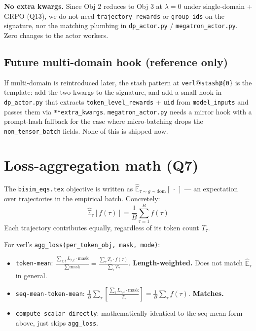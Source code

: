 \documentclass{article}
\begin{document}
\textbf{No extra kwargs.} Since Obj 2 reduces to Obj 3 at $\lambda=0$ under
single-domain + GRPO (Q13), we do not need \texttt{trajectory\_rewards}
or \texttt{group\_ids} on the signature, nor the matching plumbing in
\texttt{dp\_actor.py} / \texttt{megatron\_actor.py}. Zero changes to the
actor workers.

\subsection{Future multi-domain hook (reference only)}

If multi-domain is reintroduced later, the stash pattern at
\texttt{verl}@\texttt{stash@\{0\}} is the template: add the two kwargs to
the signature, and add a small hook in \texttt{dp\_actor.py} that extracts
\texttt{token\_level\_rewards} + \texttt{uid} from \texttt{model\_inputs}
and passes them via \texttt{**extra\_kwargs}. \texttt{megatron\_actor.py}
needs a mirror hook with a prompt-hash fallback for the case where
micro-batching drops the \texttt{non\_tensor\_batch} fields. None of this
is shipped now.

\section{Loss-aggregation math (Q7)}

The \texttt{bisim\_eqs.tex} objective is written as
$\widehat{\mathbb{E}}_{\tau \sim g \sim \text{dom}}[\,\cdot\,]$ --- an
expectation over trajectories in the empirical batch. Concretely:
\[
\widehat{\mathbb{E}}_\tau[f(\tau)] = \frac{1}{B} \sum_{\tau = 1}^{B} f(\tau)
\]
Each trajectory contributes equally, regardless of its token count $T_\tau$.

For verl's \texttt{agg\_loss(per\_token\_obj, mask, mode)}:
\begin{itemize}
\item \texttt{token-mean}: $\frac{\sum_{\tau,t} L_{\tau,t} \cdot \text{mask}}{\sum \text{mask}} = \frac{\sum_\tau T_\tau \cdot f(\tau)}{\sum_\tau T_\tau}$. \textbf{Length-weighted.} Does not match $\widehat{\mathbb{E}}_\tau$ in general.
\item \texttt{seq-mean-token-mean}: $\frac{1}{B}\sum_\tau \left[\frac{\sum_t L_{\tau,t} \cdot \text{mask}}{T_\tau}\right] = \frac{1}{B}\sum_\tau f(\tau)$. \textbf{Matches.}
\item \texttt{compute scalar directly}: mathematically identical to the seq-mean form above, just skips \texttt{agg\_loss}.
\end{itemize}
\end{document}
